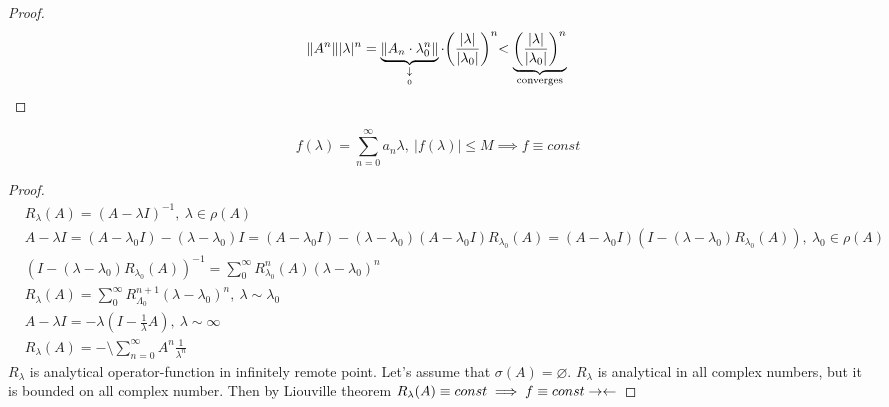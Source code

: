 \begin{proof}\leavevmode
    \[
      \|A^n\| |\lambda|^n = \underbrace{\|A_n \cdot \lambda_0^n\|}_{\underset{0}{\downarrow}} \cdot
      \biggl( \frac{|\lambda|}{|\lambda_0|} \biggl)^n < \underbrace{\biggl(
      \frac{|\lambda|}{|\lambda_0|} \biggl)^n}_{\text{converges}} \qedhere
    \]
\end{proof}

\begin{thm}[Liouville]
  \[
    f(\lambda) = \sum_{n = 0}^\infty a_n \lambda,\ 
    |f(\lambda)| \leq M \implies f \equiv const
  \]
\end{thm}

\begin{proof}
  \begin{align*}
    &R_\lambda(A) = (A - \lambda I)^{-1},\ \lambda \in \rho(A) \\
    &A - \lambda I = (A - \lambda_0 I) - (\lambda - \lambda_0) I  = (A - \lambda_0 I) - (\lambda - \lambda_0) (A - \lambda_0 I) R_{\lambda_0}(A) = (A - \lambda_0 I)(I - (\lambda - \lambda_0)R_{\lambda_0}(A)),\ \lambda_0 \in \rho(A)\\ 
    &(I - (\lambda - \lambda_0) R_{\lambda_0}(A))^{-1} = \sum_0^\infty R_{\lambda_0}^n(A)(\lambda - \lambda_0)^n \\
    &R_\lambda(A) = \sum_0^\infty R_{\Lambda_0}^{n + 1} (\lambda - \lambda_0)^n,\ \lambda \sim \lambda_0 \\
    &A - \lambda I = -\lambda(I - \frac 1\lambda A),\ \lambda \sim \infty \\
    &R_\lambda(A) = -\setminus \sum_{n = 0}^\infty A^n \frac{1}{\lambda^n}
  \end{align*}
  $R_\lambda$ is analytical operator-function in infinitely remote point.
  Let's assume that $\sigma(A) = \varnothing$. 
  $R_\lambda$ is analytical in all complex numbers, but it is bounded on all
  complex number. Then by Liouville theorem $R_\lambda(A) \equiv const \implies
  f \equiv const \rightarrow\leftarrow$
\end{proof}
